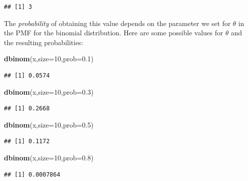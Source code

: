 \documentclass[12pt,]{krantz}
\newenvironment{Shaded}{\begin{snugshade}}{\end{snugshade}}
\newcommand{\DataTypeTok}[1]{\textcolor[rgb]{0.13,0.29,0.53}{#1}}
\newcommand{\DecValTok}[1]{\textcolor[rgb]{0.00,0.00,0.81}{#1}}
\newcommand{\FloatTok}[1]{\textcolor[rgb]{0.00,0.00,0.81}{#1}}
\newcommand{\KeywordTok}[1]{\textcolor[rgb]{0.13,0.29,0.53}{\textbf{#1}}}
\newcommand{\NormalTok}[1]{#1}
\begin{document}
\begin{verbatim}
## [1] 3
\end{verbatim}

The \emph{probability} of obtaining this value depends on the parameter we set for \(\theta\) in the PMF for the binomial distribution. Here are some possible values for \(\theta\) and the resulting probabilities:

\begin{Shaded}
\begin{Highlighting}[]
\KeywordTok{dbinom}\NormalTok{(x,}\DataTypeTok{size=}\DecValTok{10}\NormalTok{,}\DataTypeTok{prob=}\FloatTok{0.1}\NormalTok{)}
\end{Highlighting}
\end{Shaded}

\begin{verbatim}
## [1] 0.0574
\end{verbatim}

\begin{Shaded}
\begin{Highlighting}[]
\KeywordTok{dbinom}\NormalTok{(x,}\DataTypeTok{size=}\DecValTok{10}\NormalTok{,}\DataTypeTok{prob=}\FloatTok{0.3}\NormalTok{)}
\end{Highlighting}
\end{Shaded}

\begin{verbatim}
## [1] 0.2668
\end{verbatim}

\begin{Shaded}
\begin{Highlighting}[]
\KeywordTok{dbinom}\NormalTok{(x,}\DataTypeTok{size=}\DecValTok{10}\NormalTok{,}\DataTypeTok{prob=}\FloatTok{0.5}\NormalTok{)}
\end{Highlighting}
\end{Shaded}

\begin{verbatim}
## [1] 0.1172
\end{verbatim}

\begin{Shaded}
\begin{Highlighting}[]
\KeywordTok{dbinom}\NormalTok{(x,}\DataTypeTok{size=}\DecValTok{10}\NormalTok{,}\DataTypeTok{prob=}\FloatTok{0.8}\NormalTok{)}
\end{Highlighting}
\end{Shaded}

\begin{verbatim}
## [1] 0.0007864
\end{verbatim}
\end{document}
